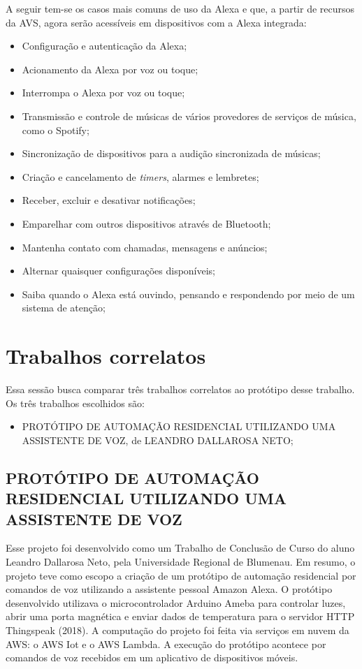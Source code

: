 A seguir tem-se os casos mais comuns de uso da Alexa e que, a partir de recursos da AVS, agora serão acessíveis em dispositivos com a Alexa integrada:
\begin{itemize}
	\item Configuração e autenticação da Alexa;
	\item Acionamento da Alexa por voz ou toque;
	\item Interrompa o Alexa por voz ou toque;
	\item Transmissão e controle de músicas de vários provedores de serviços de música, como o Spotify;
	\item Sincronização de dispositivos para a audição sincronizada de músicas;
	\item Criação e cancelamento de \textit{timers}, alarmes e lembretes;
	\item Receber, excluir e desativar notificações;
	\item Emparelhar com outros dispositivos através de Bluetooth;
	\item Mantenha contato com chamadas, mensagens e anúncios;
	\item Alternar quaisquer configurações disponíveis;
	\item Saiba quando o Alexa está ouvindo, pensando e respondendo por meio de um sistema de atenção;
\end{itemize}

\section{Trabalhos correlatos}

Essa sessão busca comparar três trabalhos correlatos ao protótipo desse trabalho. Os três trabalhos escolhidos são:
\begin{itemize}
	\item PROTÓTIPO DE AUTOMAÇÃO RESIDENCIAL UTILIZANDO UMA ASSISTENTE DE VOZ, de LEANDRO DALLAROSA NETO;
\end{itemize}

\subsection{PROTÓTIPO DE AUTOMAÇÃO RESIDENCIAL UTILIZANDO UMA ASSISTENTE DE VOZ}\label{subsection_prototipo_de_automacao_residencial_utilizando_uma_assistente_de_voz}
Esse projeto foi desenvolvido como um Trabalho de Conclusão de Curso do aluno Leandro Dallarosa Neto, pela Universidade Regional de Blumenau. Em resumo, o projeto teve como escopo a criação de um protótipo de automação residencial por comandos de voz utilizando a assistente pessoal Amazon Alexa. O protótipo desenvolvido utilizava o microcontrolador Arduino Ameba para controlar luzes, abrir uma porta magnética e enviar dados de temperatura para o servidor HTTP Thingspeak (2018). A computação do projeto foi feita via serviços em nuvem da AWS: o AWS Iot e o AWS Lambda. A execução do protótipo acontece por comandos de voz recebidos em um aplicativo de dispositivos móveis.

